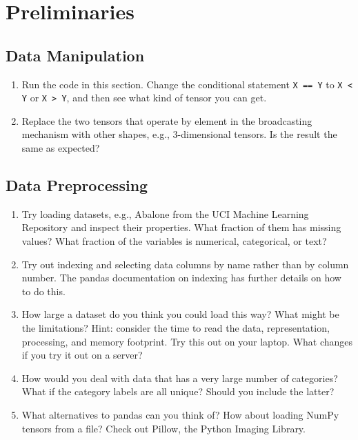 \documentclass{article}
\begin{document}
\tableofcontents

\newpage
\setcounter{section}{1}
\section{Preliminaries}
\subsection{Data Manipulation}
\begin{enumerate}
\item Run the code in this section. Change the conditional statement \texttt{X == Y} to \texttt{X < Y} or \texttt{X > Y}, and then see what kind of tensor you can get.
\item Replace the two tensors that operate by element in the broadcasting mechanism with other shapes, e.g., 3-dimensional tensors. Is the result the same as expected?
\end{enumerate}

\subsection{Data Preprocessing}
\begin{enumerate}
    \item Try loading datasets, e.g., Abalone from the UCI Machine Learning Repository and inspect their properties. What fraction of them has missing values? What fraction of the variables is numerical, categorical, or text?

    \item Try out indexing and selecting data columns by name rather than by column number. The pandas documentation on indexing has further details on how to do this.

    \item How large a dataset do you think you could load this way? What might be the limitations? Hint: consider the time to read the data, representation, processing, and memory footprint. Try this out on your laptop. What changes if you try it out on a server?

    \item How would you deal with data that has a very large number of categories? What if the category labels are all unique? Should you include the latter?

    \item What alternatives to pandas can you think of? How about loading NumPy tensors from a file? Check out Pillow, the Python Imaging Library.
\end{enumerate}
\end{document}
